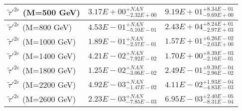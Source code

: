 \documentclass{article}
\begin{document}
\begin{center}
\begin{tabular}{ |l|c|c| }
 \hline
 $\tilde{\tau}'^{2e}$ (M=500 GeV) & $3.17E+00^{+NAN}_{-2.32E+00}$ & $9.19E+01^{+8.34E-01}_{-9.69E+00}$ \\
 \hline
 $\tilde{\tau}'^{2e}$ (M=800 GeV) & $4.53E-01^{+NAN}_{-5.10E-01}$ & $2.43E+04^{+8.24E+01}_{-2.97E+03}$ \\
 \hline
 $\tilde{\tau}'^{2e}$ (M=1000 GeV) & $1.89E-01^{+NAN}_{-2.57E-01}$ & $1.57E+01^{+6.26E-02}_{-2.03E+00}$ \\
 \hline
 $\tilde{\tau}'^{2e}$ (M=1400 GeV) & $4.21E-02^{+NAN}_{-7.92E-02}$ & $1.70E+00^{+8.39E-03}_{-2.16E-01}$ \\
 \hline
 $\tilde{\tau}'^{2e}$ (M=1800 GeV) & $1.25E-02^{+NAN}_{-3.06E-02}$ & $2.49E-01^{+9.39E-04}_{-2.96E-02}$ \\
 \hline
 $\tilde{\tau}'^{2e}$ (M=2200 GeV) & $4.92E-03^{+NAN}_{-1.47E-02}$ & $4.11E-02^{+1.93E-04}_{-4.83E-03}$ \\
 \hline
 $\tilde{\tau}'^{2e}$ (M=2600 GeV) & $2.23E-03^{+NAN}_{-7.85E-03}$ & $6.95E-03^{+2.40E-05}_{-8.31E-04}$ \\
 \hline
 \end{tabular}
 \end{center}
 
\end{document}
